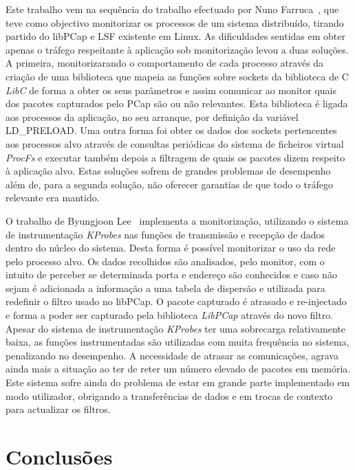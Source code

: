\documentclass[a4paper]{llncs}
\begin{document}
Este trabalho vem na sequência do trabalho efectuado por Nuno Farruca~\cite{Farruca:2009,duarte10}, que teve como objectivo monitorizar os processos de um sistema distribuído, tirando partido do libPCap e LSF existente em Linux. As dificuldades sentidas em obter apenas o tráfego respeitante à aplicação sob monitorização levou a duas soluções. A primeira, monitorizarando o comportamento de cada processo através da criação de uma biblioteca que mapeia as funções sobre sockets da biblioteca de C \textit{LibC} de forma a obter os seus parâmetros e assim comunicar ao monitor quais dos pacotes capturados pelo PCap são ou não relevantes. Esta biblioteca é ligada aos processos da aplicação, no seu arranque, por definição da variável LD\_PRELOAD.
 Uma outra forma foi obter os dados dos sockets pertencentes aos processos alvo através de consultas periódicas do sistema de ficheiros virtual \textit{ProcFs} e executar também depois a filtragem de quais os pacotes dizem respeito à aplicação alvo.  Estas soluções sofrem de grandes problemas de desempenho além de, para a segunda solução, não oferecer garantias de que todo o tráfego relevante era mantido.

O trabalho de Byungjoon Lee~\cite{1688981} implementa a monitorização, utilizando o sistema de instrumentação \textit{KProbes} nas funções de transmissão e recepção de dados dentro do núcleo do sistema. Desta forma é possível monitorizar o uso da rede pelo processo alvo. Os dados recolhidos são analisados, pelo monitor, com o intuito de perceber se determinada porta e endereço são conhecidos e caso não sejam é adicionada a informação a uma tabela de dispersão e utilizada para redefinir o filtro usado no libPCap. O pacote capturado  é atrasado e re-injectado e forma a poder ser capturado pela biblioteca \textit{LibPCap} através do novo filtro.
Apesar do sistema de instrumentação \textit{KProbes} ter uma sobrecarga relativamente baixa, as funções instrumentadas são utilizadas com muita frequência no sistema, penalizando no desempenho. A necessidade de atrasar as comunicações, agrava ainda mais a situação ao ter de reter um número elevado de pacotes em memória. Este sistema sofre ainda do problema de estar em grande parte implementado em modo utilizador, obrigando a transferências de dados e em trocas de contexto para actualizar os filtros.



\section{Conclusões}
\label{sec:conclusions}
\end{document}
